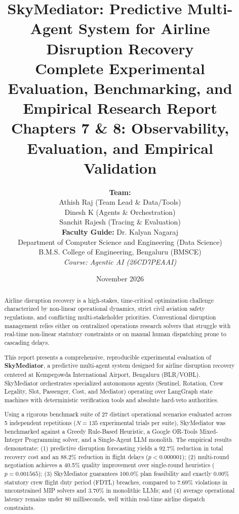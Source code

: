 \documentclass[11pt,a4paper,oneside]{report}
\title{\textbf{\LARGE SkyMediator: Predictive Multi-Agent System for Airline Disruption Recovery}\\[0.5em]
\Large Complete Experimental Evaluation, Benchmarking, and Empirical Research Report\\[0.3em]
\large Chapters 7 \& 8: Observability, Evaluation, and Empirical Validation}
\author{\textbf{Team:}\\[0.2em]
Athish Raj (Team Lead \& Data/Tools)\\
Dinesh K (Agents \& Orchestration)\\
Sanchit Rajesh (Tracing \& Evaluation)\\[0.8em]
\textbf{Faculty Guide:} Dr. Kalyan Nagaraj\\[0.3em]
Department of Computer Science and Engineering (Data Science)\\
B.M.S. College of Engineering, Bengaluru (BMSCE)\\
\textit{Course: Agentic AI (26CD7PEAAI)}}
\date{November 2026}
\begin{document}
\maketitle

\begin{abstract}
Airline disruption recovery is a high-stakes, time-critical optimization challenge characterized by non-linear operational dynamics, strict civil aviation safety regulations, and conflicting multi-stakeholder priorities. Conventional disruption management relies either on centralized operations research solvers that struggle with real-time non-linear statutory constraints or on manual human dispatching prone to cascading delays. 

This report presents a comprehensive, reproducible experimental evaluation of \textbf{SkyMediator}, a predictive multi-agent system designed for airline disruption recovery centered at Kempegowda International Airport, Bengaluru (BLR/VOBL). SkyMediator orchestrates specialized autonomous agents (Sentinel, Rotation, Crew Legality, Slot, Passenger, Cost, and Mediator) operating over LangGraph state machines with deterministic verification tools and absolute hard-veto authorities.

Using a rigorous benchmark suite of 27 distinct operational scenarios evaluated across 5 independent repetitions ($N=135$ experimental trials per suite), SkyMediator was benchmarked against a Greedy Rule-Based Heuristic, a Google OR-Tools Mixed-Integer Programming solver, and a Single-Agent LLM monolith. The empirical results demonstrate: (1) predictive disruption forecasting yields a 92.7\% reduction in total recovery cost and an 88.2\% reduction in flight delays ($p < 0.000001$); (2) multi-round negotiation achieves a 40.5\% quality improvement over single-round heuristics ($p = 0.001565$); (3) SkyMediator guarantees 100.0\% plan feasibility and exactly 0.00\% statutory crew flight duty period (FDTL) breaches, compared to 7.69\% violations in unconstrained MIP solvers and 3.70\% in monolithic LLMs; and (4) average operational latency remains under 80 milliseconds, well within real-time airline dispatch constraints.
\end{abstract}

\tableofcontents
\listoffigures
\listoftables

\clearpage



\clearpage


\end{document}
